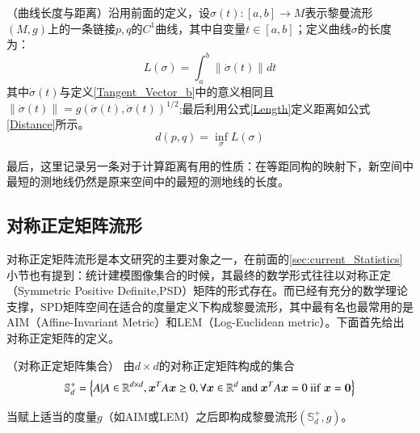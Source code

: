 \begin{definition}
{\heiti（曲线长度与距离）}沿用前面的定义，设$\sigma(t):[a,b]\rightarrow  M$表示黎曼流形$(M,g)$上的一条链接$p,q$的$C^{1}$曲线，其中自变量$t \in [a,b]$；定义曲线$\sigma$的长度为：
\begin{equation}
\label{Length}
L(\sigma)=\int_{a}^{b}{\|\dot{\sigma}(t)\|}dt
\end{equation}
其中$\dot{\sigma}(t)$与定义\ref{Tangent_Vector_b}中的意义相同且$\|\dot{\sigma}(t)\|=g(\dot{\sigma}(t),\dot{\sigma}(t))^{1/2}$;最后利用公式\ref{Length}定义距离如公式\ref{Distance}所示。
\begin{equation}
\label{Distance}
d(p,q)=\inf_{\sigma}L(\sigma)
\end{equation}
\end{definition}
最后，这里记录另一条对于计算距离有用的性质：在等距同构的映射下，新空间中最短的测地线仍然是原来空间中的最短的测地线的长度。
\subsection{对称正定矩阵流形}
\label{sec:Manifold_SPD}
对称正定矩阵流形是本文研究的主要对象之一，在前面的\ref{sec:current_Statistics}小节也有提到：统计建模图像集合的时候，其最终的数学形式往往以对称正定（Symmetric Positive Definite,PSD）矩阵的形式存在。而已经有充分的数学理论支撑，SPD矩阵空间在适合的度量定义下构成黎曼流形，其中最有名也最常用的是AIM\cite{AIM_metric}（Affine-Invariant Metric）和LEM\cite{LEM_metric}（Log-Euclidean metric）。下面首先给出对称正定矩阵的定义。
\begin{definition}
{\heiti（对称正定矩阵集合）} 由$d \times d$的对称正定矩阵构成的集合
\begin{equation}
\label{SPD_Matrices}
\mathbb{S}_{d}^{+}=\left\{A|A \in \mathbb{R}^{d\times d},\bm{x}^{T}A\bm{x} \geq 0,\forall \bm{x} \in \mathbb{R}^{d}~{\rm and}~\bm{x}^{T}A\bm{x}=0~{\rm iif}~\bm{x}=\bm{0}\right\}
\end{equation}
\end{definition}
当赋上适当的度量$g$（如AIM\cite{AIM_metric}或LEM\cite{LEM_metric}）之后即构成黎曼流形$(\mathbb{S}_{d}^{+},g)$。

